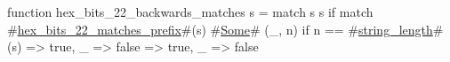 function hex_bits_22_backwards_matches s = match s {
  s if match #\hyperref[sailRISCVzhexzybitszy22zymatcheszyprefix]{hex\_bits\_22\_matches\_prefix}#(s) {
    #\hyperref[sailRISCVzSome]{Some}# (_, n) if n == #\hyperref[sailRISCVzstringzylength]{string\_length}#(s) => true,
    _ => false
  } => true,
  _ => false
}
